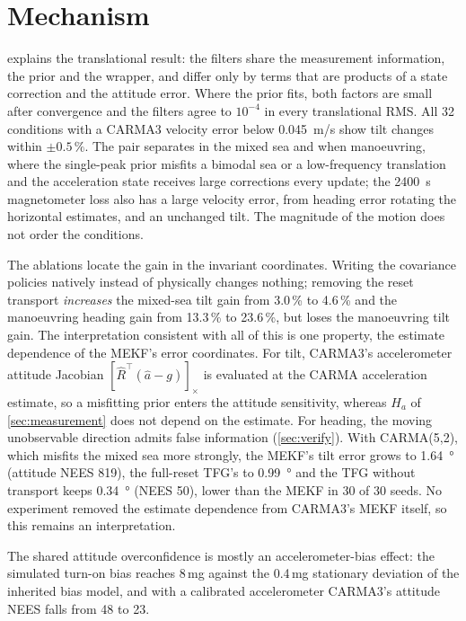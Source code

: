 \documentclass[conference]{IEEEtran}
\newcommand{\Skew}[1]{\left[#1\right]_\times}
\theoremstyle{bodysmall}
\begin{document}
\section{Mechanism}
\label{sec:mechanism}
 explains the translational result: the filters share the
measurement information, the prior and the wrapper, and differ only by terms
that are products of a state correction and the attitude error. Where the
prior fits, both factors are small after convergence and the filters agree to
$10^{-4}$ in every translational RMS. All 32 conditions with a CARMA3
velocity error below \SI{0.045}{m/s} show tilt changes within $\pm0.5\,\%$.
The pair separates in the mixed sea and when manoeuvring, where the
single-peak prior misfits a bimodal sea or a low-frequency translation and the
acceleration state receives large corrections every update; the \SI{2400}{s}
magnetometer loss also has a large velocity error, from heading error rotating
the horizontal estimates, and an unchanged tilt. The magnitude of the motion
does not order the conditions.

The ablations locate the gain in the invariant coordinates. Writing the
covariance policies natively instead of physically changes nothing; removing
the reset transport \emph{increases} the mixed-sea tilt gain from 3.0\,\% to
4.6\,\% and the manoeuvring heading gain from 13.3\,\% to 23.6\,\%, but loses
the manoeuvring tilt gain. The interpretation consistent with all of this is
one property, the estimate dependence of the MEKF's error coordinates. For
tilt, CARMA3's accelerometer attitude Jacobian $\Skew{\hat R^{\top}(\hat a-g)}$
is evaluated at the CARMA acceleration estimate, so a misfitting prior enters
the attitude sensitivity, whereas $H_a$ of \cref{sec:measurement} does not
depend on the estimate. For heading, the moving unobservable direction admits
false information (\cref{sec:verify}). With CARMA(5,2), which misfits the
mixed sea more strongly, the MEKF's tilt error grows to \SI{1.64}{\degree}
(attitude NEES 819), the full-reset TFG's to \SI{0.99}{\degree} and the TFG
without transport keeps \SI{0.34}{\degree} (NEES 50), lower than the MEKF in
30 of 30 seeds. No experiment removed the estimate dependence from CARMA3's
MEKF itself, so this remains an interpretation.

The shared attitude overconfidence is mostly an accelerometer-bias effect: the
simulated turn-on bias reaches 8\,mg against the 0.4\,mg stationary deviation
of the inherited bias model, and with a calibrated accelerometer CARMA3's
attitude NEES falls from 48 to 23.
\end{document}
